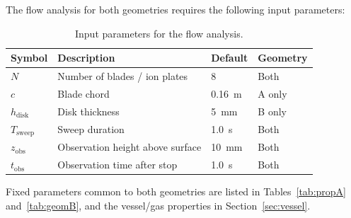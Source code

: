\documentclass[11pt,a4paper]{article}
\begin{document}
The flow analysis for both geometries requires the following input
parameters:

\begin{table}[H]
\centering
\caption{Input parameters for the flow analysis.}
\label{tab:params_analysis}
\begin{tabular}{llll}
\toprule
Symbol & Description & Default & Geometry \\
\midrule
$N$  & Number of blades / ion plates & 8 & Both \\
$c$  & Blade chord & \SI{0.16}{m} & A only \\
$h_\mathrm{disk}$ & Disk thickness & \SI{5}{mm} & B only \\
$T_\mathrm{sweep}$ & Sweep duration & \SI{1.0}{s} & Both \\
$z_\mathrm{obs}$ & Observation height above surface & \SI{10}{mm} & Both \\
$t_\mathrm{obs}$ & Observation time after stop & \SI{1.0}{s} & Both \\
\bottomrule
\end{tabular}
\end{table}

Fixed parameters common to both geometries are listed in
Tables~\ref{tab:propA} and~\ref{tab:geomB}, and the vessel/gas
properties in Section~\ref{sec:vessel}.
\end{document}
